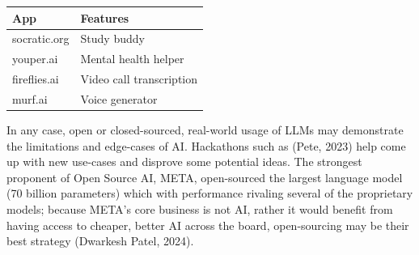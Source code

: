 \documentclass[
  letterpaper,
  DIV=11,
  numbers=noendperiod]{scrartcl}
\begin{document}
\begin{longtable}[]{@{}ll@{}}
\toprule\noalign{}
App & Features \\
\midrule\noalign{}
\endhead
\bottomrule\noalign{}
\endlastfoot
socratic.org & Study buddy \\
youper.ai & Mental health helper \\
fireflies.ai & Video call transcription \\
murf.ai & Voice generator \\
\end{longtable}

In any case, open or closed-sourced, real-world usage of LLMs may
demonstrate the limitations and edge-cases of AI. Hackathons such as
(Pete, 2023) help come up with new use-cases and disprove some potential
ideas. The strongest proponent of Open Source AI, META, open-sourced the
largest language model (70 billion parameters) which with performance
rivaling several of the proprietary models; because META's core business
is not AI, rather it would benefit from having access to cheaper, better
AI across the board, open-sourcing may be their best strategy (Dwarkesh
Patel, 2024).
\end{document}
